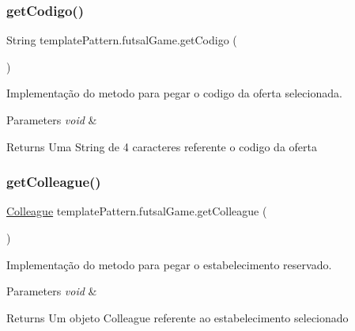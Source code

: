 \subsubsection{\texorpdfstring{getCodigo()}{getCodigo()}}
{\footnotesize\ttfamily String template\+Pattern.\+futsal\+Game.\+get\+Codigo (\begin{DoxyParamCaption}{ }\end{DoxyParamCaption})}



Implementação do metodo para pegar o codigo da oferta selecionada. 


\begin{DoxyParams}{Parameters}
{\em void} & \\
\hline
\end{DoxyParams}
\begin{DoxyReturn}{Returns}
Uma String de 4 caracteres referente o codigo da oferta 
\end{DoxyReturn}
\mbox{\label{classtemplate_pattern_1_1futsal_game_a6b3eca238b3ca9c7c56d7b116fc385db}} 
\subsubsection{\texorpdfstring{getColleague()}{getColleague()}}
{\footnotesize\ttfamily \mbox{\hyperlink{classmediator_pattern_1_1_colleague}{Colleague}} template\+Pattern.\+futsal\+Game.\+get\+Colleague (\begin{DoxyParamCaption}{ }\end{DoxyParamCaption})}



Implementação do metodo para pegar o estabelecimento reservado. 


\begin{DoxyParams}{Parameters}
{\em void} & \\
\hline
\end{DoxyParams}
\begin{DoxyReturn}{Returns}
Um objeto Colleague referente ao estabelecimento selecionado 
\end{DoxyReturn}
\mbox{\label{classtemplate_pattern_1_1futsal_game_a9438b264fb0817cfb287af7ee860b7fa}} 
